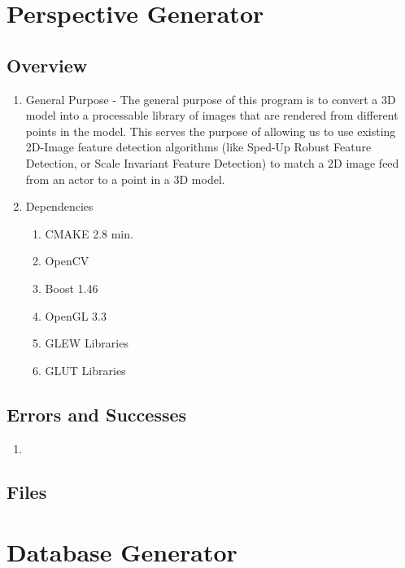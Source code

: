 \documentclass[a4paper,11pt]{article}
\begin{document}
    \section{Perspective Generator}

        \subsection{Overview}
        \begin{enumerate}
        \item General Purpose - The general purpose of this program is to convert a 3D model into a processable library of images that are rendered from different points in the model. This serves the purpose of allowing us to use existing 2D-Image feature detection algorithms (like Sped-Up Robust Feature Detection, or Scale Invariant Feature Detection) to match a 2D image feed from an actor to a point in a 3D model.
        \item Dependencies
            \begin{enumerate}
            \item CMAKE 2.8 min.
            \item OpenCV
            \item Boost 1.46
            \item OpenGL 3.3
            \item GLEW Libraries
            \item GLUT Libraries
            \end{enumerate}
        \end{enumerate}

        \subsection{Errors and Successes}
        \begin{enumerate}
        \item 
        \end{enumerate}

        \subsection{Files}

        



    \section{Database Generator}

  

  
\end{document}
